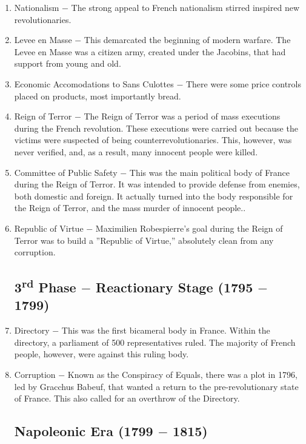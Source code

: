 \documentclass[12pt]{article}
\begin{document}
\begin{enumerate}
\item Nationalism $-$ The strong appeal to French nationalism stirred inspired new revolutionaries.

\item Levee en Masse $-$ This demarcated the beginning of modern warfare. The Levee en Masse was a citizen army, created under the Jacobins, that had support from young and old.

\item Economic Accomodations to Sans Culottes $-$ There were some price controls placed on products, most importantly bread.

\item Reign of Terror $-$ The Reign of Terror was a period of mass executions during the French revolution. These executions were carried out because the victims were suspected of being counterrevolutionaries. This, however, was never verified, and, as a result, many innocent people were killed. 

\item Committee of Public Safety $-$ This was the main political body of France during the Reign of Terror. It was intended to provide defense from enemies, both domestic and foreign. It actually turned into the body responsible for the Reign of Terror, and the mass murder of innocent people..

\item Republic of Virtue $-$ Maximilien Robespierre's goal during the Reign of Terror was to build a ''Republic of Virtue,'' absolutely clean from any corruption. 

\subsection{3\textsuperscript{rd} Phase $-$ Reactionary Stage (1795 $-$ 1799)}

\item Directory $-$ This was the first bicameral body in France. Within the directory, a parliament of 500 representatives ruled. The majority of French people, however, were against this ruling body.

\item Corruption $-$ Known as the Conspiracy of Equals, there was a plot in 1796, led by Gracchus Babeuf, that wanted a return to the pre-revolutionary state of France. This also called for an overthrow of the Directory. 

\subsection{Napoleonic Era (1799 $-$ 1815)}


\end{enumerate}
\end{document}
